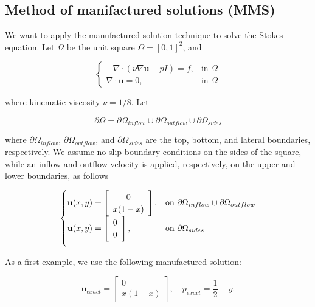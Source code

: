 \documentclass[11pt,a4paper,titlepage]{report}
\begin{document}
\subsection{Method of manifactured solutions (MMS)}

We want to apply the manufactured solution technique to solve the Stokes equation. Let $\Omega$ be the unit square $\Omega = [0,1]^2$, and

\vspace{0.2cm}
\[
\begin{cases}
- \nabla \cdot (\nu \nabla \mathbf{u} - pI) = f, & \mbox{in } \Omega \\
\nabla \cdot \mathbf{u} = 0, & \mbox{in } \Omega
\end{cases}
\]
\vspace{0.2cm}

where kinematic viscosity $\nu = 1/8$. Let

\[
\partial \Omega = \partial \Omega_{inflow} \cup \partial \Omega_{outflow} \cup \partial \Omega_{sides}
\]

where $\partial \Omega_{inflow}$, $\partial \Omega_{outflow}$, and $\partial \Omega_{sides}$ are the top, bottom, and lateral boundaries, respectively. We assume no-slip boundary conditions on the sides of the square, while an inflow and outflow velocity is applied, respectively, on the upper and lower boundaries, as follows

\[
\begin{cases}
\mathbf{u}(x,y) = \left[ \begin{array}{c} 0 \\ x(1-x) \end{array} \right] , & \mbox{on } \partial \Omega_{inflow} \cup \partial \Omega_{outflow} \\

\vspace{.2cm}

\mathbf{u}(x,y) = \left[ \begin{array}{c} 0 \\ 0 \end{array} \right], & \mbox{on } \partial \Omega_{sides}
\end{cases}
\]

As a first example, we use the following manufactured solution:

\[
\mathbf{u}_{exact} = \left[ \begin{array}{c} 0 \\ x(1-x) \end{array} \right], \quad
p_{exact} = \frac{1}{2}-y.
\]
\end{document}
